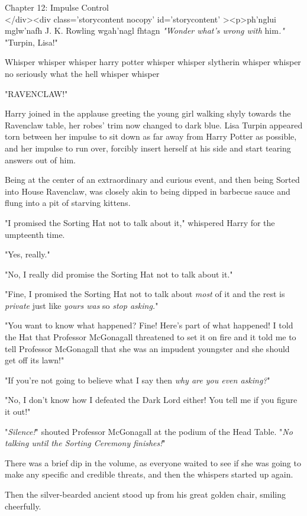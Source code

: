 
Chapter 12: Impulse Control\\
</div><div  class='storycontent nocopy' id='storycontent' ><p>ph'nglui 
mglw'nafh J. K. Rowling wgah'nagl fhtagn
\sbreak
\emph{"Wonder what's wrong with} him\emph{."}
\sbreak
"Turpin, Lisa!"

Whisper whisper whisper harry potter whisper whisper slytherin whisper whisper 
no seriously what the hell whisper whisper

"RAVENCLAW!"

Harry joined in the applause greeting the young girl walking shyly towards the 
Ravenclaw table, her robes' trim now changed to dark blue. Lisa Turpin appeared 
torn between her impulse to sit down as far away from Harry Potter as possible, 
and her impulse to run over, forcibly insert herself at his side and start 
tearing answers out of him.

Being at the center of an extraordinary and curious event, and then being 
Sorted into House Ravenclaw, was closely akin to being dipped in barbecue sauce 
and flung into a pit of starving kittens.

"I promised the Sorting Hat not to talk about it," whispered Harry for the 
umpteenth time.

"Yes, really."

"No, I really did promise the Sorting Hat not to talk about it."

"Fine, I promised the Sorting Hat not to talk about \emph{most} of it and the 
rest is \emph{private} just like \emph{yours was} so \emph{stop asking.}"

"You want to know what happened? Fine! Here's part of what happened! I told the 
Hat that Professor McGonagall threatened to set it on fire and it told me to 
tell Professor McGonagall that she was an impudent youngster and she should get 
off its lawn!"

"If you're not going to believe what I say then \emph{why are you even asking?}"

"No, I don't know how I defeated the Dark Lord either! You tell me if you 
figure it out!"

"\emph{Silence!}" shouted Professor McGonagall at the podium of the Head Table. 
"\emph{No talking until the Sorting Ceremony finishes!}"

There was a brief dip in the volume, as everyone waited to see if she was going 
to make any specific and credible threats, and then the whispers started up 
again.

Then the silver-bearded ancient stood up from his great golden chair, smiling 
cheerfully.

